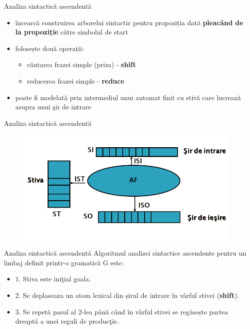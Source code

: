 \documentclass[pdf]{beamer}
\begin{document}
\begin{frame}{Analiza sintactică ascendentă}
\begin{itemize}
\item 
încearcă construirea arborelui sintactic pentru propoziția dată \textbf{pleacând de la propoziție} către simbolul de start

\item 
folosește două operații:

   \begin{itemize}
     \item 
     căutarea frazei simple (priza) - \textbf{shift}
     \item
     reducerea frazei simple - \textbf{reduce}
   \end{itemize}
   
\item
poate fi modelată prin intermediul unui automat finit cu stivă care lucrează asupra unui şir de intrare
\end{itemize}
\end{frame}



\begin{frame}{Analiza sintactică ascendentă}
\begin{figure}
\centering
\includegraphics[scale=0.7]{img/afsa}
\end{figure}
\end{frame}



\begin{frame}{Analiza sintactică ascendentă}
Algoritmul analizei sintactice ascendente pentru un limbaj definit printr-o gramatică G este:

\begin{itemize}
\item 
$1.$ Stiva este iniţial goala.

\item
$2.$ Se deplaseaza un atom lexical din șirul de intrare în vârful stivei (\textbf{shift}).

\item
$3.$ Se repetă pasul al 2-lea până când în vârful stivei se regăsește partea dreaptă a unei reguli de producţie.
\end{itemize}
\end{frame}
\end{document}
